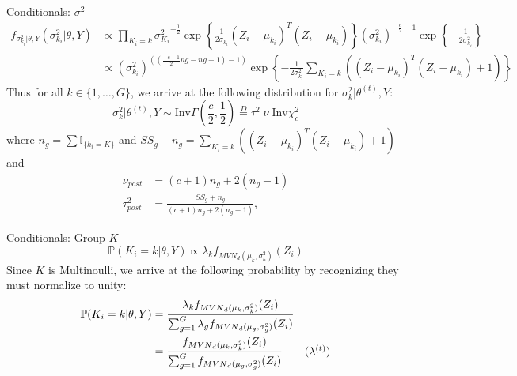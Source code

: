 \documentclass{beamer}
\begin{document}
\scriptsize
\begin{frame}{Conditionals: $\sigma^2$}
\begin{align*}
f_{\sigma_{k_i}^2|\theta, Y}(\sigma_{k_i}^2|\theta, Y) &\propto \prod_{K_i = k} 
{\sigma_{K_i}^2}^{-\frac{1}{2}} 
\exp \left\{ \frac{1}{2 \sigma_{k_i}}(Z_i-\mu_{k_i})^T(Z_i-\mu_{k_i})\right\} 
(\sigma_{k_i}^2)^{-\frac{c}{2} -1}  
 \exp \left\{-\frac{1}{2 \sigma_{k_i}^2}\right\} \\
 & \propto (\sigma_{k_i} ^2 )^{\left( (\frac{-c-1}{2} ng - ng +1 ) -1\right)}  
 \exp\left\{-\frac{1}{2 \sigma_{k_i}^2} \sum_{K_i = k} \left((Z_i-\mu_{k_i})^T(Z_i-\mu_{k_i})+1\right)\right\}
\end{align*}
Thus for all $k \in \{1, \ldots, G\}$, we arrive at the following distribution for $\sigma_k^2 | \theta^{(t)}, Y$:
\[\sigma_k^2 | \theta^{(t)}, Y \sim \text{Inv} \Gamma \left( \frac{c}{2}, \frac{1}{2}\right)  \overset{D}= \tau^2  \;\nu \; \text{Inv} \chi^2_c\]
where $n_g = \sum \mathbb{I} _{\{ k_i = K\}}$ and $SS_g + n_g = \sum_{K_i = k} \left((Z_i-\mu_{k_i})^T(Z_i-\mu_{k_i})+1\right) $ and
\begin{align*}
\nu_{post} &= (c + 1) n_g + 2( n_g - 1 )   \\
\tau^2_{post} &= \frac{SS_g + n_g} {(c + 1) n_g + 2 ( n_g -1)},
\end{align*} 
\end{frame}

\small
\begin{frame}{Conditionals: Group $K$}
\[\mathbb{P}(K_i = k | \theta, Y) \propto \lambda_k f_{{MVN}_d(\mu_k, \sigma_k^2)}(Z_i)\]
Since $K$ is Multinoulli, we arrive at the following probability by recognizing they must normalize to unity:
\begin{align*}
\mathbb{P}(K_i = k | \theta, Y) &= \frac{\lambda_k f_{{MVN}_d(\mu_k, \sigma_k^2)}(Z_i)}{\sum_{g=1}^G\lambda_g f_{{MVN}_d(\mu_g, \sigma_g^2)}(Z_i)} \\
&= \frac{f_{{MVN}_d(\mu_k, \sigma_k^2)}(Z_i)}{\sum_{g=1}^G f_{{MVN}_d(\mu_g, \sigma_g^2)}(Z_i)} \tag{$\lambda^{(t)}$}
\end{align*}
\end{frame}
\end{document}
